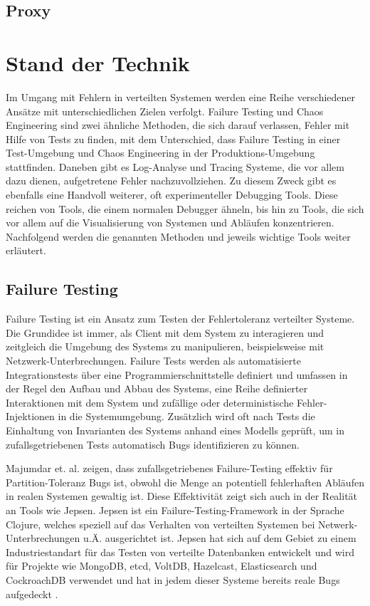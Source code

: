 \documentclass[12pt,a4paper]{report}
\begin{document}
\section{Proxy}

\chapter{Stand der Technik}
Im Umgang mit Fehlern in verteilten Systemen werden eine Reihe verschiedener Ansätze mit unterschiedlichen Zielen verfolgt.
Failure Testing und Chaos Engineering sind zwei ähnliche Methoden, die sich darauf verlassen, Fehler mit Hilfe von Tests zu
finden, mit dem Unterschied, dass Failure Testing in einer Test-Umgebung und Chaos Engineering in der Produktions-Umgebung
stattfinden. Daneben gibt es Log-Analyse und Tracing Systeme, die vor allem dazu dienen, aufgetretene Fehler nachzuvollziehen. Zu
diesem Zweck gibt es ebenfalls eine Handvoll weiterer, oft experimenteller Debugging Tools. Diese reichen von Tools, die einem
normalen Debugger ähneln, bis hin zu Tools, die sich vor allem auf die Visualisierung von Systemen und Abläufen konzentrieren.
Nachfolgend werden die genannten Methoden und jeweils wichtige Tools weiter erläutert.
\cite{challenges_and_options}

\section{Failure Testing}
Failure Testing ist ein Ansatz zum Testen der Fehlertoleranz verteilter Systeme. Die Grundidee ist immer, als Client mit dem
System zu interagieren und zeitgleich die Umgebung des Systems zu manipulieren, beispielsweise mit Netzwerk-Unterbrechungen.
Failure Tests werden als automatisierte Integrationstests über eine Programmierschnittstelle definiert und umfassen in der Regel den Aufbau
und Abbau des Systems, eine Reihe definierter Interaktionen mit dem System und zufällige oder deterministische Fehler-Injektionen
in die Systemumgebung. Zusätzlich wird oft nach Tests die Einhaltung von Invarianten des Systems anhand eines Modells geprüft, um
in zufallsgetriebenen Tests automatisch Bugs identifizieren zu können. \cite{failify_masters_thesis}

Majumdar et. al. \cite{why_is_random_testing_effective} zeigen, dass zufallsgetriebenes Failure-Testing effektiv für
Partition-Toleranz Bugs ist, obwohl die Menge an potentiell fehlerhaften Abläufen in realen Systemen gewaltig ist. Diese
Effektivität zeigt sich auch in der Realität an Tools wie Jepsen. Jepsen ist ein Failure-Testing-Framework in der Sprache
Clojure, welches speziell auf das Verhalten von verteilten Systemen bei Netwerk-Unterbrechungen u.Ä. ausgerichtet ist. Jepsen hat
sich auf dem Gebiet zu einem Industriestandart für das Testen von verteilte Datenbanken entwickelt \cite{abstracting_the_geniuses}
und wird für Projekte wie MongoDB, etcd, VoltDB, Hazelcast, Elasticsearch und CockroachDB verwendet und hat in jedem dieser
Systeme bereits reale Bugs aufgedeckt \cite{jepsen_analyses}.
\end{document}
